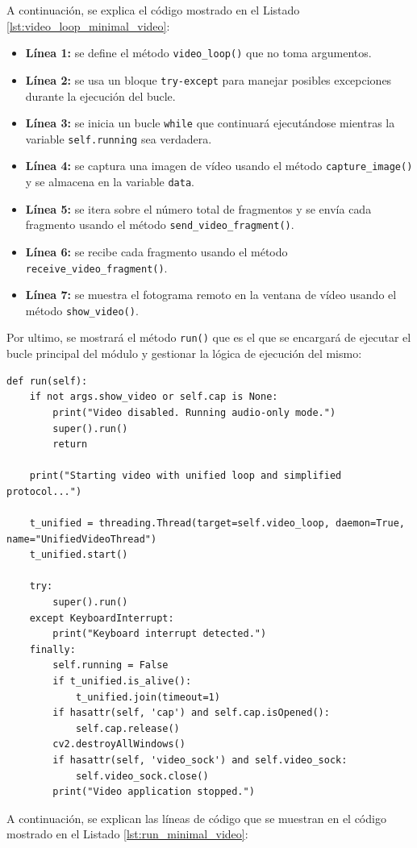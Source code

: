 \vspace{\baselineskip}
A continuación, se explica el código mostrado en el Listado \ref{lst:video_loop_minimal_video}:
\vspace{\baselineskip}
\begin{itemize}
    \item \textbf{Línea 1:} se define el método \texttt{video\_loop()} que no toma argumentos.
    \item \textbf{Línea 2:} se usa un bloque \texttt{try-except} para manejar posibles excepciones durante la ejecución del bucle.
    \item \textbf{Línea 3:} se inicia un bucle \texttt{while} que continuará ejecutándose mientras la variable \texttt{self.running} sea verdadera.
    \item \textbf{Línea 4:} se captura una imagen de vídeo usando el método \texttt{capture\_image()} y se almacena en la variable \texttt{data}.
    \item \textbf{Línea 5:} se itera sobre el número total de fragmentos y se envía cada fragmento usando el método \texttt{send\_video\_fragment()}.
    \item \textbf{Línea 6:} se recibe cada fragmento usando el método \texttt{receive\_video\_fragment()}.
    \item \textbf{Línea 7:} se muestra el fotograma remoto en la ventana de vídeo usando el método \texttt{show\_video()}.
\end{itemize}

\vspace{\baselineskip}

Por ultimo, se mostrará el método \texttt{run()} que es el que se encargará de ejecutar el bucle principal del módulo y gestionar la lógica de ejecución del mismo:
\begin{lstlisting}[style=pythonstyle, caption={Método \texttt{run()} de \textit{Minimal\_Video}.}, label={lst:run_minimal_video}]
def run(self):
    if not args.show_video or self.cap is None:
        print("Video disabled. Running audio-only mode.")
        super().run()
        return

    print("Starting video with unified loop and simplified protocol...")

    t_unified = threading.Thread(target=self.video_loop, daemon=True, name="UnifiedVideoThread")
    t_unified.start()

    try:
        super().run()
    except KeyboardInterrupt:
        print("Keyboard interrupt detected.")
    finally:
        self.running = False
        if t_unified.is_alive():
            t_unified.join(timeout=1)
        if hasattr(self, 'cap') and self.cap.isOpened():
            self.cap.release()
        cv2.destroyAllWindows()
        if hasattr(self, 'video_sock') and self.video_sock:
            self.video_sock.close()
        print("Video application stopped.")
\end{lstlisting}
\vspace{\baselineskip}
A continuación, se explican las líneas de código que se muestran en el código mostrado en el Listado \ref{lst:run_minimal_video}:

